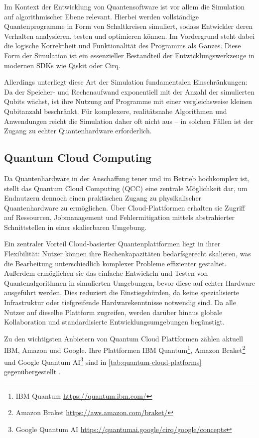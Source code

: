 Im Kontext der Entwicklung von Quantensoftware ist vor allem die Simulation auf algorithmischer Ebene relevant. Hierbei werden vollständige Quantenprogramme in Form von Schaltkreisen simuliert, sodass Entwickler deren Verhalten analysieren, testen und optimieren können. Im Vordergrund steht dabei die logische Korrektheit und Funktionalität des Programms als Ganzes. Diese Form der Simulation ist ein essenzieller Bestandteil der Entwicklungswerkzeuge in modernen SDKs wie Qiskit oder Cirq.

Allerdings unterliegt diese Art der Simulation fundamentalen Einschränkungen: Da der Speicher- und Rechenaufwand exponentiell mit der Anzahl der simulierten Qubits wächst, ist ihre Nutzung auf Programme mit einer vergleichsweise kleinen Qubitanzahl beschränkt. Für komplexere, realitätsnahe Algorithmen und Anwendungen reicht die Simulation daher oft nicht aus -- in solchen Fällen ist der Zugang zu echter Quantenhardware erforderlich. \autocite{cicero_simulation_2025}

\subsection{Quantum Cloud Computing}
\label{sec:quantum-cloud-computing}

Da Quantenhardware in der Anschaffung teuer und im Betrieb hochkomplex ist, stellt das Quantum Cloud Computing (QCC) eine zentrale Möglichkeit dar, um Endnutzern dennoch einen praktischen Zugang zu physikalischer Quantenhardware zu ermöglichen. Über Cloud-Plattformen erhalten sie Zugriff auf Ressourcen, Jobmanagement und Fehlermitigation mittels abstrahierter Schnittstellen in einer skalierbaren Umgebung.

Ein zentraler Vorteil Cloud-basierter Quantenplattformen liegt in ihrer Flexibilität: Nutzer können ihre Rechenkapazitäten bedarfsgerecht skalieren, was die Bearbeitung unterschiedlich komplexer Probleme effizienter gestaltet. Außerdem ermöglichen sie das einfache Entwickeln und Testen von Quantenalgorithmen in simulierten Umgebungen, bevor diese auf echter Hardware ausgeführt werden. Dies reduziert die Einstiegshürden, da keine spezialisierte Infrastruktur oder tiefgreifende Hardwarekenntnisse notwendig sind. Da alle Nutzer auf dieselbe Plattform zugreifen, werden darüber hinaus globale Kollaboration und standardisierte Entwicklungsumgebungen begünstigt.

Zu den wichtigsten Anbietern von Quantum Cloud Plattformen zählen aktuell IBM, Amazon und Google. Ihre Plattformen IBM Quantum\footnote{IBM Quantum \url{https://quantum.ibm.com/}}, Amazon Braket\footnote{Amazon Braket \url{https://aws.amazon.com/braket/}} und Google Quantum AI\footnote{Google Quantum AI \url{https://quantumai.google/cirq/google/concepts}} sind in \autoref{tab:quantum-cloud-platforms} gegenübergestellt \autocite{golec_quantum_2024}.

